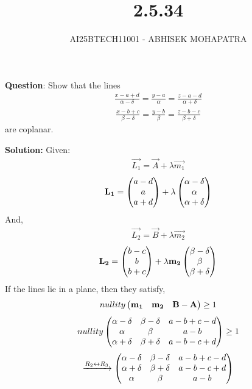 \documentclass{beamer}
\title{2.5.34}
\author{AI25BTECH11001 - ABHISEK MOHAPATRA}
\numberwithin{equation}{section}
\begin{document}
{\let\newpage\relax\maketitle}
\renewcommand{\thefigure}{\theenumi}
\renewcommand{\thetable}{\theenumi}


	 	\textbf{Question}:
		Show that the lines
		\begin{align}
		\frac{x-a+d}{\alpha-\delta}=\frac{y-a}{\alpha}=\frac{z-a-d}{\alpha+\delta}
		\end{align}
		\begin{align}
		\frac{x-b+c}{\beta-\delta}=\frac{y-b}{\beta}=\frac{z-b-c}{\beta+\delta}
		\end{align}
are coplanar.
		

		\textbf{Solution:}
		Given:
		\begin{align}
				\vec{L_1} = \vec{A} + \lambda\vec{m_1}
		\end{align}
		\begin{align}
				\mathbf{L_1} = \begin{pmatrix}a-d \\a\\a+d\end{pmatrix} + \lambda
				\begin{pmatrix}\alpha - \delta\\\alpha\\\alpha + \delta \end{pmatrix}
		\end{align}And,
		\begin{align}
				\vec{L_2} = \vec{B} + \lambda\vec{m_2}
		\end{align}
		\begin{align}
				\mathbf{L_2} = \begin{pmatrix}b-c\\b\\b+c\end{pmatrix} + \lambda\mathbf{m_2}
				\begin{pmatrix}\beta - \delta\\\beta\\\beta + \delta \end{pmatrix}
		\end{align}
		If the lines lie in a plane, then they satisfy,
		\begin{align}
				nullity\begin{pmatrix}\mathbf{m_1}&\mathbf{m_2}&\mathbf{B-A}\end{pmatrix}\geq 1
		\end{align}
		\begin{align}
				nullity\begin{pmatrix}
						\alpha - \delta & \beta -\delta & a-b+c-d \\
						\alpha & \beta & a-b \\
						\alpha + \delta & \beta +\delta & a-b-c+d
				\end{pmatrix}\geq 1
		\end{align}
		\begin{align}
				\xrightarrow[]{R_2\leftrightarrow R_3}\begin{pmatrix}
						\alpha - \delta & \beta -\delta & a-b+c-d \\
						\alpha + \delta & \beta +\delta & a-b-c+d\\
						\alpha & \beta & a-b 
				\end{pmatrix}
		\end{align}
\end{document}
